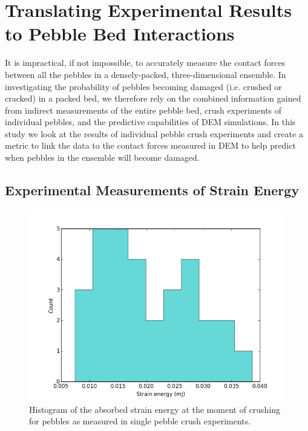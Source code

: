 \section{Translating Experimental Results to Pebble Bed Interactions}\label{sec:theoryStrainEnergy}

It is impractical, if not impossible, to accurately measure the contact forces between all the pebbles in a densely-packed, three-dimensional ensemble. In investigating the probability of pebbles becoming damaged (i.e. crushed or cracked) in a packed bed, we therefore rely on the combined information gained from indirect measurements of the entire pebble bed, crush experiments of individual pebbles, and the predictive capabilities of DEM simulations. In this study we look at the results of individual pebble crush experiments and create a metric to link the data to the contact forces measured in DEM to help predict when pebbles in the ensemble will become damaged.

\subsection{Experimental Measurements of Strain Energy}
\begin{figure}[!t]
\centering
    \includegraphics[width=\doubleimagewidth]{chapters/figures/fzk-w-histogram.png}
    \caption{Histogram of the absorbed strain energy at the moment of crushing for \lis pebbles as measured in single pebble crush experiments.}
    \label{fig:fzk-w-hist}
\end{figure}

